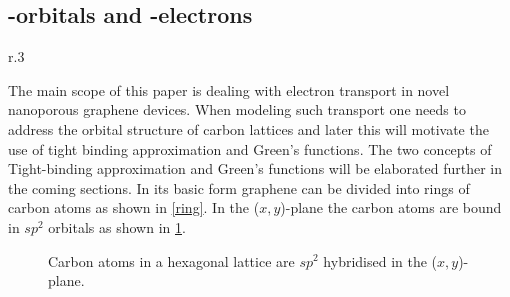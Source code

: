 \subsection{\mathinhead{\pi}{\pi}-orbitals and \mathinhead{\pi}{\pi}-electrons}
\begin{wrapfigure}[10]{r}{.3\textwidth}
	\centering
	\caption{Graphene lattices consists of hexagonal arrangements of carbon atoms.}\label{ring}
\end{wrapfigure}
The main scope of this paper is dealing with electron transport in novel nanoporous graphene devices.
When modeling such transport one needs to address the orbital structure of carbon lattices and later this will motivate the use of tight binding approximation and Green's functions. The two concepts of Tight-binding approximation and Green's functions will be elaborated further in the coming sections.
In its basic form graphene can be divided into rings of carbon atoms as shown in \cref{ring}. In the (\(x,y\))-plane the carbon atoms are bound in \(sp^2\) orbitals as shown in \cref{sp2}.
\vspace{-2\baselineskip}
\begin{center}
\begin{figure}[H]
	\centering
	\caption{Carbon atoms in a hexagonal lattice are \(sp^2\) hybridised in the (\(x,y\))-plane.}\label{sp2}
\end{figure}
\end{center}
